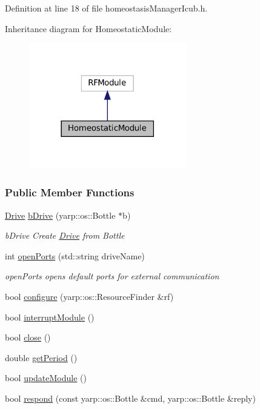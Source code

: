 Definition at line 18 of file homeostasis\+Manager\+Icub.\+h.



Inheritance diagram for Homeostatic\+Module\+:
\nopagebreak
\begin{figure}[H]
\begin{center}
\leavevmode
\includegraphics[width=194pt]{classHomeostaticModule__inherit__graph}
\end{center}
\end{figure}
\subsubsection*{Public Member Functions}
\begin{DoxyCompactItemize}
\item 
\hyperlink{group__homeostasis_classDrive}{Drive} \hyperlink{group__homeostasis_acccfc1bf4e585a64558d59f14e3b4971}{b\+Drive} (yarp\+::os\+::\+Bottle $\ast$b)
\begin{DoxyCompactList}\small\item\em b\+Drive Create \hyperlink{group__homeostasis_classDrive}{Drive} from Bottle \end{DoxyCompactList}\item 
int \hyperlink{group__homeostasis_a7ecc57cb05ab4ea92d62c3b963ac86ca}{open\+Ports} (std\+::string drive\+Name)
\begin{DoxyCompactList}\small\item\em open\+Ports opens default ports for external communication \end{DoxyCompactList}\item 
bool \hyperlink{group__homeostasis_a445bbd663f3af838c4333e3c241ce95c}{configure} (yarp\+::os\+::\+Resource\+Finder \&rf)
\item 
bool \hyperlink{group__homeostasis_a79746e7d7d8f751c06363ff80b9bf8f6}{interrupt\+Module} ()
\item 
bool \hyperlink{group__homeostasis_aa02cc6b879d746dbb9691dc16d2bf6d1}{close} ()
\item 
double \hyperlink{group__homeostasis_a63f6720809be33541f2e8fb9b7affaa2}{get\+Period} ()
\item 
bool \hyperlink{group__homeostasis_a614902e3bfe699aea53497a100929b1c}{update\+Module} ()
\item 
bool \hyperlink{group__homeostasis_a5b37922dc43bdd683b89c93c91e89db1}{respond} (const yarp\+::os\+::\+Bottle \&cmd, yarp\+::os\+::\+Bottle \&reply)
\end{DoxyCompactItemize}


